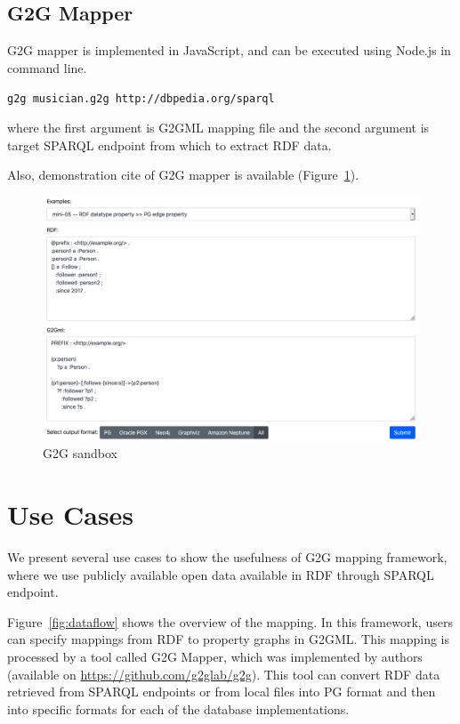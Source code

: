\documentclass[runningheads]{llncs}
\begin{document}
\subsection{G2G Mapper}

G2G mapper is implemented in JavaScript, and can be executed using Node.js in command line.

\texttt{g2g musician.g2g http://dbpedia.org/sparql}

\noindent where the first argument is G2GML mapping file and the second argument is target SPARQL endpoint from which to extract RDF data.

Also, demonstration cite of G2G mapper is available (Figure~\ref{fig:sandbox}).

\begin{figure}
\center
\includegraphics[width=1.0\textwidth]{sandbox.png}
\caption{G2G sandbox}
\label{fig:sandbox}
\end{figure}


\section{Use Cases}

We  present several use cases to show the usefulness of G2G mapping framework, where we use publicly available open data available in RDF through SPARQL endpoint.

Figure~\ref{fig:dataflow} shows the overview of the mapping.
In this framework, users can specify mappings from RDF to property graphs in G2GML.
This mapping is processed by a tool called G2G Mapper, which was implemented by authors (available on \url{https://github.com/g2glab/g2g}). This tool can convert RDF data retrieved from SPARQL endpoints or from local files into PG format and then into specific formats for each of the database implementations.
\end{document}
